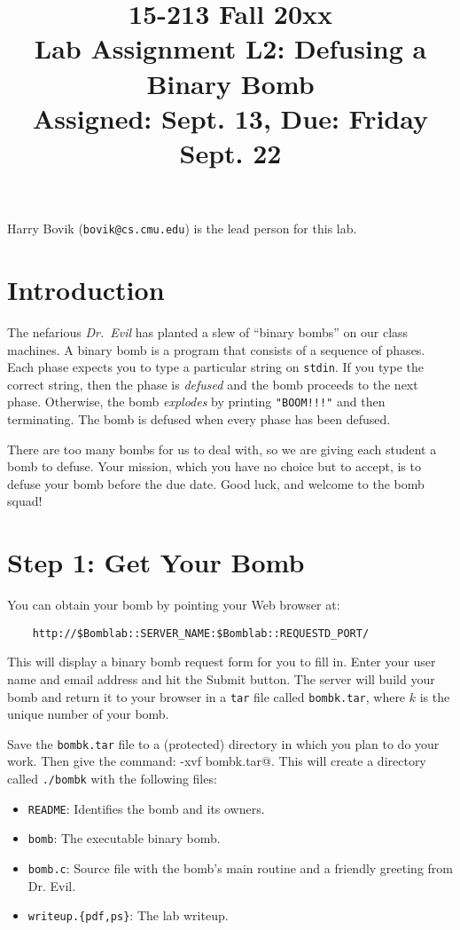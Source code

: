 \documentclass[11pt]{article}
\title{15-213 Fall 20xx\\
Lab Assignment L2: Defusing a Binary Bomb\\
Assigned: Sept. 13, Due: Friday Sept. 22\\
}
\author{}
\date{}
\begin{document}
\maketitle

Harry Bovik ({\tt bovik@cs.cmu.edu}) is the lead person for this lab.

\section{Introduction}

The nefarious {\em Dr.~Evil} has planted a slew of ``binary bombs'' on
our class machines.  A binary bomb is a program that consists of a
sequence of phases. Each phase expects you to type a particular string
on \texttt{stdin}.  If you type the correct string, then the phase is
{\em defused} and the bomb proceeds to the next phase. Otherwise, the
bomb {\em explodes} by printing \verb."BOOM!!!". and then
terminating. The bomb is defused when every phase has been defused.

There are too many bombs for us to deal with, so we are giving each
student a bomb to defuse.  Your mission, which you have no choice but to
accept, is to defuse your bomb before the due date.  Good luck, and
welcome to the bomb squad!

\section*{Step 1: Get Your Bomb}

You can obtain your bomb by pointing your Web browser at:

\begin{verbatim}
    http://$Bomblab::SERVER_NAME:$Bomblab::REQUESTD_PORT/
\end{verbatim}

This will display a binary bomb request form for you to fill in.
Enter your user name and email address and hit the Submit button.  The
server will build your bomb and return it to your browser in a
\texttt{tar} file called \texttt{bombk.tar}, where $k$ is the unique
number of your bomb.

Save the \texttt{bombk.tar} file to a (protected) directory
in which you plan to do your work.  Then give the command: 
\verb@tar -xvf bombk.tar@.  This will create a directory called
\texttt{./bombk} with the following files:
\begin{itemize}
\item \texttt{README}: Identifies the bomb and its owners.
\item \texttt{bomb}: The executable binary bomb.
\item \texttt{bomb.c}: Source file with the bomb's main routine and a friendly greeting from Dr. Evil.
\item \texttt{writeup.\{pdf,ps\}}: The lab writeup.
\end{itemize}
\end{document}
